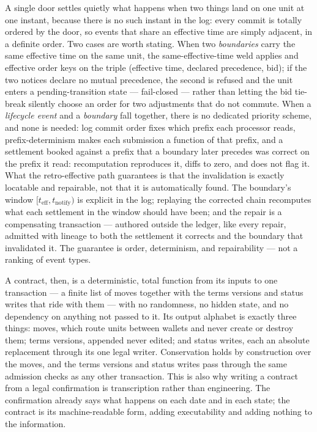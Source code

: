 A single door settles quietly what happens when two things land on one unit at one
instant, because there is no such instant in the log: every commit is totally
ordered by the door, so events that share an effective time are simply adjacent, in
a definite order. Two cases are worth stating. When two \emph{boundaries} carry the
same effective time on the same unit, the same-effective-time weld applies and
effective order keys on the triple (effective time, declared precedence, bid); if
the two notices declare no mutual precedence, the second is refused and the unit
enters a pending-transition state --- fail-closed --- rather than letting the bid
tie-break silently choose an order for two adjustments that do not commute. When a
\emph{lifecycle event} and a \emph{boundary} fall together, there is no dedicated
priority scheme, and none is needed: log commit order fixes which prefix each
processor reads, prefix-determinism makes each submission a function of that prefix,
and a settlement booked against a prefix that a boundary later precedes was correct
on the prefix it read: recomputation reproduces it, diffs to zero, and does not flag
it. What the retro-effective path guarantees is that the invalidation is exactly
locatable and repairable, not that it is automatically found. The boundary's window
$[t_{\text{eff}}, t_{\text{notify}})$ is explicit in the log; replaying the corrected
chain recomputes what each settlement in the window should have been; and the repair
is a compensating transaction --- authored outside the ledger, like every repair,
admitted with lineage to both the settlement it corrects and the boundary that
invalidated it. The guarantee is order, determinism, and repairability --- not a
ranking of event types.

A contract, then, is a deterministic, total function from its inputs to one
transaction --- a finite list of moves together with the terms versions and status
writes that ride with them --- with no randomness, no hidden state, and no dependency
on anything not passed to it. Its output alphabet is exactly three things: moves,
which route units between wallets and never create or destroy them; terms versions,
appended never edited; and status writes, each an absolute replacement through its
one legal writer. Conservation holds by construction over the moves, and the terms
versions and status writes pass through the same admission checks as any other
transaction. This is also why writing a contract from a legal confirmation is
transcription rather than engineering. The confirmation already says what happens
on each date and in each state; the contract is its machine-readable form, adding
executability and adding nothing to the information.

